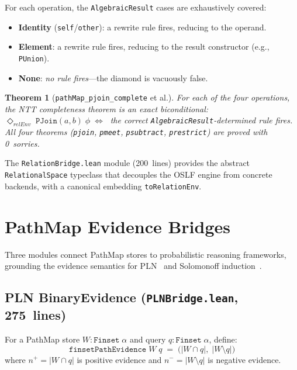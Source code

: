 \documentclass[11pt]{article}
\newtheorem{theorem}{Theorem}[section]
\theoremstyle{definition}
\theoremstyle{remark}
\newcommand{\PathMap}{\textup{PathMap}}
\begin{document}
\noindent
For each operation, the \texttt{AlgebraicResult} cases are exhaustively
covered:
\begin{itemize}[nosep]
  \item \textbf{Identity} (\texttt{self}/\texttt{other}): a rewrite rule fires,
        reducing to the operand.
  \item \textbf{Element}: a rewrite rule fires, reducing to the result
        constructor (e.g., \texttt{PUnion}).
  \item \textbf{None}: \emph{no rule fires}---the diamond is vacuously false.
\end{itemize}

\begin{theorem}[\texttt{pathMap\_pjoin\_complete} et al.]
For each of the four operations, the NTT completeness theorem is an exact
biconditional:
$\Diamond_{\mathit{relEnv}}\;\texttt{PJoin}(a,b)\;\phi
\;\iff\;$
the correct \texttt{AlgebraicResult}-determined rule fires.
All four theorems (\texttt{pjoin}, \texttt{pmeet}, \texttt{psubtract},
\texttt{prestrict}) are proved with 0~sorries.
\end{theorem}

\noindent
The \texttt{RelationBridge.lean} module (200~lines) provides the abstract
\texttt{RelationalSpace} typeclass that decouples the OSLF engine from
concrete backends, with a canonical embedding \texttt{toRelationEnv}.

\section{PathMap Evidence Bridges}
\label{sec:evidence}

Three modules connect \PathMap{} stores to probabilistic reasoning
frameworks, grounding the evidence semantics for
PLN~\cite{GoertzelPLN2009} and Solomonoff
induction~\cite{Solomonoff1964}.

\subsection{PLN BinaryEvidence (\texttt{PLNBridge.lean}, 275~lines)}

For a \PathMap{} store $W : \texttt{Finset}\;\alpha$ and query
$q : \texttt{Finset}\;\alpha$, define:
\[
  \texttt{finsetPathEvidence}\;W\;q \;=\; \bigl(\lvert W \cap q\rvert,\;
  \lvert W \setminus q \rvert\bigr)
\]
where $n^+ = \lvert W \cap q\rvert$ is positive evidence and
$n^- = \lvert W \setminus q\rvert$ is negative evidence.
\end{document}
